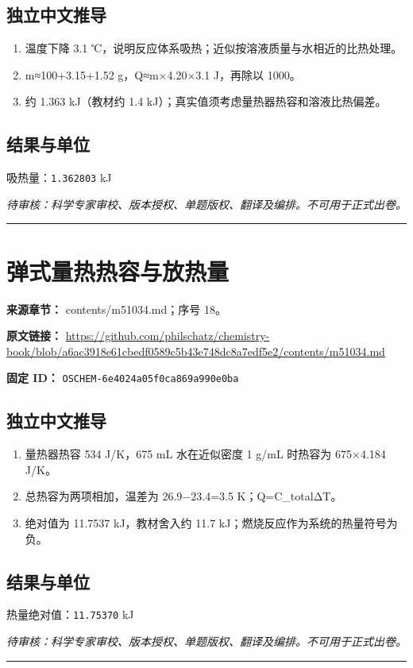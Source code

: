\documentclass[UTF8,11pt,oneside,openany,fontset=none]{ctexbook}
\begin{document}
\subsection*{独立中文推导}
\begin{enumerate}
\item 温度下降 3.1 ℃，说明反应体系吸热；近似按溶液质量与水相近的比热处理。
\item m≈100+3.15+1.52 g，Q≈m×4.20×3.1 J，再除以 1000。
\item 约 1.363 kJ（教材约 1.4 kJ）；真实值须考虑量热器热容和溶液比热偏差。
\end{enumerate}
\subsection*{结果与单位}
\noindent 吸热量：\texttt{1.362803} kJ\par
\noindent\textit{待审核：科学专家审校、版本授权、单题版权、翻译及编排。不可用于正式出卷。}
\medskip\hrule\medskip
\section{弹式量热热容与放热量}
\noindent\textbf{来源章节：} contents/m51034.md；序号 18。\par
\noindent\textbf{原文链接：} \url{https://github.com/philschatz/chemistry-book/blob/a6ac3918e61cbedf0589c5b43e748dc8a7edf5e2/contents/m51034.md}\par
\noindent\textbf{固定 ID：} \texttt{OSCHEM-6e4024a05f0ca869a990e0ba}\par
\subsection*{独立中文推导}
\begin{enumerate}
\item 量热器热容 534 J/K，675 mL 水在近似密度 1 g/mL 时热容为 675×4.184 J/K。
\item 总热容为两项相加，温差为 26.9−23.4=3.5 K；Q=C\_totalΔT。
\item 绝对值为 11.7537 kJ，教材舍入约 11.7 kJ；燃烧反应作为系统的热量符号为负。
\end{enumerate}
\subsection*{结果与单位}
\noindent 热量绝对值：\texttt{11.75370} kJ\par
\noindent\textit{待审核：科学专家审校、版本授权、单题版权、翻译及编排。不可用于正式出卷。}
\medskip\hrule\medskip
\end{document}
